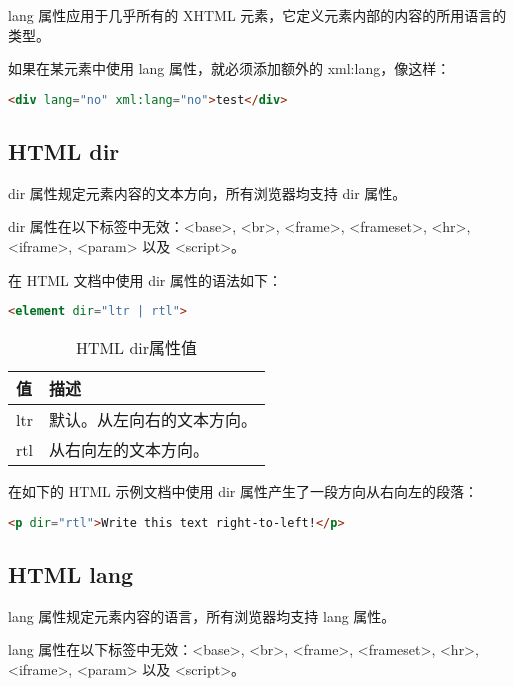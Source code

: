lang 属性应用于几乎所有的 XHTML 元素，它定义元素内部的内容的所用语言的类型。

如果在某元素中使用 lang 属性，就必须添加额外的 xml:lang，像这样：

\begin{lstlisting}[language=HTML]
<div lang="no" xml:lang="no">test</div>
\end{lstlisting}

\subsection{HTML dir}

dir 属性规定元素内容的文本方向，所有浏览器均支持 dir 属性。

dir 属性在以下标签中无效：<base>, <br>, <frame>, <frameset>, <hr>, <iframe>, <param> 以及 <script>。

在 HTML 文档中使用 dir 属性的语法如下：

\begin{lstlisting}[language=HTML]
<element dir="ltr | rtl">
\end{lstlisting}

\begin{table}[!h]
\centering
\vspace{-10pt}
\caption{HTML dir属性值}
\label{html_dir_attribute}
\begin{tabular}{|m{80pt}|m{290pt}|}
\hline
值	&描述\\
\hline
ltr	&默认。从左向右的文本方向。\\
\hline
rtl	&从右向左的文本方向。\\
\hline
\end{tabular}
\end{table}

在如下的 HTML 示例文档中使用 dir 属性产生了一段方向从右向左的段落：

\begin{lstlisting}[language=HTML]
<p dir="rtl">Write this text right-to-left!</p>
\end{lstlisting}


\clearpage

\subsection{HTML lang}

lang 属性规定元素内容的语言，所有浏览器均支持 lang 属性。

lang 属性在以下标签中无效：<base>, <br>, <frame>, <frameset>, <hr>, <iframe>, <param> 以及 <script>。

